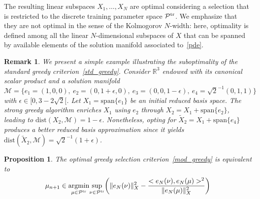 \documentclass[12pt,a4paper]{article}
\newtheorem{proposition}{Proposition}
\newtheorem{remark}{Remark}
\newcommand{\Ptr}{\mathcal P^{\rm tr}}
\newcommand{\tr}{{\rm tr}}
\newcommand{\calP}{\mathcal P}
\begin{document}
The resulting linear subspaces $X_1,\ldots,X_N$ are optimal considering a selection that is restricted to the discrete training parameter space $\Ptr$. We emphasize that they are not optimal in the sense of the Kolmogorov $N$-width: here, optimality is defined among all the 
linear $N$-dimensional subspaces of $X$ that can be spanned by available elements of the solution manifold associated to~\eqref{pde}. 
\begin{remark}
We present a simple example illustrating the suboptimality of the standard greedy criterion~\eqref{std_greedy}.
Consider $\mathbb R^3$ endowed with its canonical scalar product and a solution manifold 
$ \mathcal M = \{e_1=(1,0,0),\ e_2 = (0,1+\epsilon,0),\ e_3 = (0,0,1-\epsilon),\
e_4 = \sqrt 2^{-1}(0,1,1)\}$ with $\epsilon \in [0, 3-2\sqrt 2[$.
Let $X_1= \mathrm{span}\{e_1\}$ be an initial reduced basis space. The strong greedy algorithm enriches $X_1$ using $e_2$ through $X_2 = X_1 + \mathrm{span}\{e_2\}$, leading to 
$\mathrm{dist}(X_2,\mathcal M) = 1-\epsilon$. Nonetheless, opting for $\tilde X_2 = X_1 + \mathrm{span}\{e_4\}$
produces a better reduced basis approximation since it yields $\mathrm{dist}(\tilde X_2,\mathcal M) = 
{\sqrt{2}}^{-1}(1+\epsilon)$.
\end{remark}

\begin{proposition}
The optimal greedy selection criterion~\eqref{mod_greedy} is equivalent to
\begin{equation}
  \mu_{n+1} \in \underset{\mu \in \calP^\tr}{\mathrm{argmin}}
  \underset{\nu \in \calP^\tr} {\mathrm{\ sup\ }}
  \bigg( \|e_N(\nu)\|_X^2 -\frac{<e_N(\nu), e_N(\mu)>^2}{\|e_N(\mu)\|_X^2} \bigg)
 \end{equation}
\end{proposition}
\end{document}
